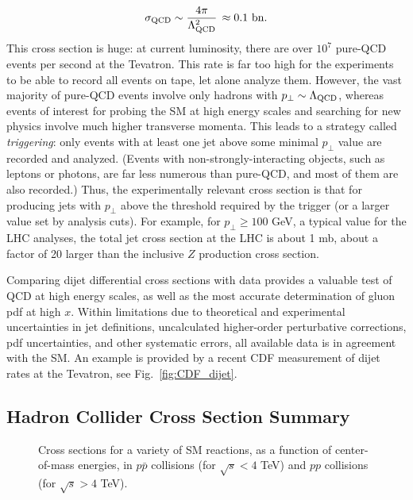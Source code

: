 \documentclass{ws-procs9x6}
\def\beq{\begin{equation}}
\def\eeq#1{\label{#1}\end{equation}}
\begin{document}
\beq
\sigma_{\rm QCD} \sim \frac{4\pi}{\Lambda_{\rm QCD}^2}\,\approx 0.1~{\rm bn}.
\eeq{allQCD}
This cross section is huge: at current luminosity, there are over $10^7$ pure-QCD events per second at the Tevatron. This rate is far too high for the experiments to be able to record all events on tape, let alone analyze them. However, the vast majority of pure-QCD events involve only hadrons with $p_\perp\sim \Lambda_{\rm QCD}$, whereas events of interest for probing the SM at high energy scales and searching for new physics  involve much higher transverse momenta. This leads to a strategy called {\it triggering}: only events with at least one jet above some minimal $p_\perp$ value are recorded and analyzed. (Events with non-strongly-interacting objects, such as leptons or photons, are far less numerous than pure-QCD, and most of them are also recorded.) Thus, the experimentally relevant cross section is that for producing jets with $p_\perp$ above the threshold required by the trigger (or a larger value set by analysis cuts). For example, for $p_\perp\geq 100$ GeV, a typical value for the LHC analyses, the total jet cross section at the LHC is about 1 mb, about a factor of 20 larger than the inclusive $Z$ production cross section.

Comparing dijet differential cross sections with data provides a valuable test of QCD at high energy scales, as well as the most accurate determination of gluon pdf at high $x$. Within limitations due to theoretical and experimental uncertainties in jet definitions, uncalculated higher-order perturbative corrections, pdf uncertainties, and other systematic errors, all available data is in agreement with the SM. An example is provided by a recent CDF measurement of dijet rates at the Tevatron, see Fig.~\ref{fig:CDF_dijet}.

\subsection{Hadron Collider Cross Section Summary}

\begin{figure}
\begin{center}
\end{center}
\caption{Cross sections for a variety of SM reactions, as a function of center-of-mass energies, in $p\bar{p}$ collisions (for $\sqrt{s}<4$ TeV) and $pp$ collisions (for $\sqrt{s}>4$ TeV).}
\label{fig:xsec_all}
\end{figure}
\end{document}
